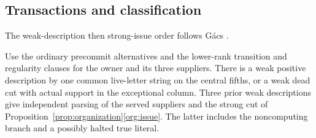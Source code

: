 \subsection{Transactions and classification}
The weak-description then strong-issue order follows G\'acs \cite[Lemmas~14.1--14.2]{gacs86}.
\begin{lemma}\label{lem:ballot}
Use the ordinary precommit alternatives and the lower-rank transition and regularity clauses for the owner and its three suppliers. There is a weak positive description by one common live-letter string on the central fifths, or a weak dead cut with actual support in the exceptional column. Three prior weak descriptions give independent parsing of the served suppliers and the strong cut of Proposition~\ref{prop:organization}\ref{org:issue}. The latter includes the noncomputing branch and a possibly halted true literal.
\end{lemma}
